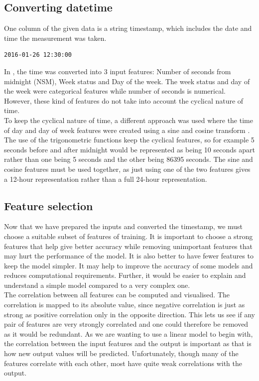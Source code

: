 \documentclass{article}
\newcommand{\n}[0]{\\[\baselineskip]}
\begin{document}
\subsection{Converting datetime}
One column of the given data is a string timestamp, which includes the date and time the measurement was taken. 
\begin{lstlisting}[caption={Example timestamp snippet}, backgroundcolor = \color{lightgray}]
2016-01-26 12:30:00
\end{lstlisting}
In \cite{paper}, the time was converted into 3 input features: Number of seconds from midnight (NSM), Week status and Day of the week. The week status and day of the week were categorical features while number of seconds is numerical. However, these kind of features do not take into account the cyclical nature of time.
\n
To keep the cyclical nature of time, a different approach was used where the time of day and day of week features were created using a sine and cosine transform \cite{cyclic}. The use of the trigonometric functions keep the cyclical features, so for example 5 seconds before and after midnight would be represented as being 10 seconds apart rather than one being 5 seconds and the other being 86395 seconds. The sine and cosine features must be used together, as just using one of the two features gives a 12-hour representation rather than a full 24-hour representation. 



\subsection{Feature selection}
Now that we have prepared the inputs and converted the timestamp, we must choose a suitable subset of features of training. It is important to choose a strong features that help give better accuracy while removing unimportant features that may hurt the performance of the model. It is also better to have fewer features to keep the model simpler. It may help to improve the accuracy of some models and reduces computational requirements. Further, it would be easier to explain and understand a simple model compared to a very complex one. 
\n
The correlation between all features can be computed and visualised. The correlation is mapped to its absolute value, since negative correlation is just as strong as positive correlation only in the opposite direction. This lets us see if any pair of features are very strongly correlated and one could therefore be removed as it would be redundant. As we are wanting to use a linear model to begin with, the correlation between the input features and the output is important as that is how new output values will be predicted. Unfortunately, though many of the features correlate with each other, most have quite weak correlations with the output.
\end{document}
